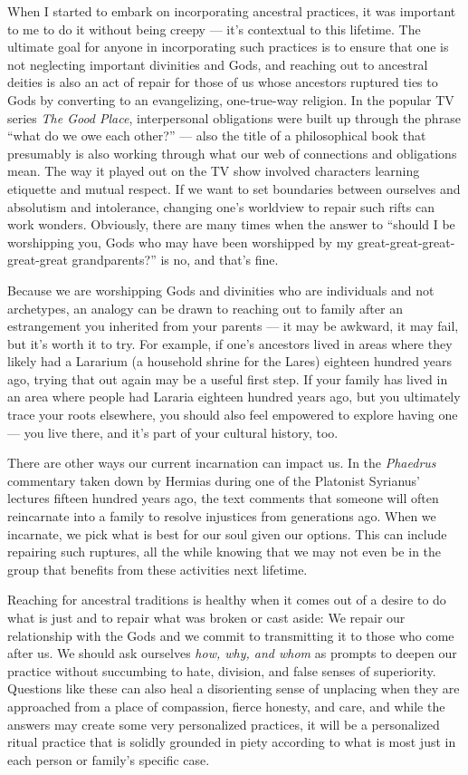 \documentclass[
]{book}
\begin{document}
When I started to embark on incorporating ancestral practices, it was important to me to do it without being creepy --- it's contextual to this lifetime. The ultimate goal for anyone in incorporating such practices is to ensure that one is not neglecting important divinities and Gods, and reaching out to ancestral deities is also an act of repair for those of us whose ancestors ruptured ties to Gods by converting to an evangelizing, one-true-way religion. In the popular TV series \emph{The Good Place}, interpersonal obligations were built up through the phrase ``what do we owe each other?'' --- also the title of a philosophical book that presumably is also working through what our web of connections and obligations mean. The way it played out on the TV show involved characters learning etiquette and mutual respect. If we want to set boundaries between ourselves and absolutism and intolerance, changing one's worldview to repair such rifts can work wonders. Obviously, there are many times when the answer to ``should I be worshipping you, Gods who may have been worshipped by my great-great-great-great-great grandparents?'' is no, and that's fine.

Because we are worshipping Gods and divinities who are individuals and not archetypes, an analogy can be drawn to reaching out to family after an estrangement you inherited from your parents --- it may be awkward, it may fail, but it's worth it to try. For example, if one's ancestors lived in areas where they likely had a Lararium (a household shrine for the Lares) eighteen hundred years ago, trying that out again may be a useful first step. If your family has lived in an area where people had Lararia eighteen hundred years ago, but you ultimately trace your roots elsewhere, you should also feel empowered to explore having one --- you live there, and it's part of your cultural history, too.

There are other ways our current incarnation can impact us. In the \emph{Phaedrus} commentary taken down by Hermias during one of the Platonist Syrianus' lectures fifteen hundred years ago, the text comments that someone will often reincarnate into a family to resolve injustices from generations ago. When we incarnate, we pick what is best for our soul given our options. This can include repairing such ruptures, all the while knowing that we may not even be in the group that benefits from these activities next lifetime.

Reaching for ancestral traditions is healthy when it comes out of a desire to do what is just and to repair what was broken or cast aside: We repair our relationship with the Gods and we commit to transmitting it to those who come after us. We should ask ourselves \emph{how, why, and whom} as prompts to deepen our practice without succumbing to hate, division, and false senses of superiority. Questions like these can also heal a disorienting sense of unplacing when they are approached from a place of compassion, fierce honesty, and care, and while the answers may create some very personalized practices, it will be a personalized ritual practice that is solidly grounded in piety according to what is most just in each person or family's specific case.
\end{document}
